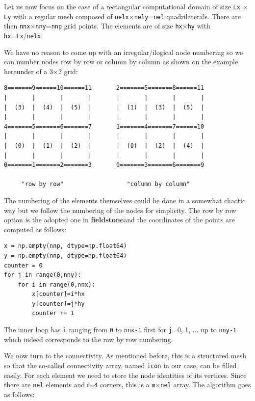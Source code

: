 \documentclass[a4paper]{article}
\newcommand{\fieldstone}{{\bf fieldstone}}
\begin{document}
Let us now focus on the case of a rectangular computational domain of size 
{\tt Lx} $\times$ {\tt Ly} with a regular mesh composed of {\tt nelx}$\times${\tt nely}={\tt nel}
   quadrilaterals.  
There are then {\tt nnx}$\times${\tt nny}={\tt nnp} grid points.
The elements are of size {\tt hx}$\times${\tt hy} with {\tt hx}={\tt Lx}/{\tt nelx}.

We have no reason to come up with an irregular/ilogical node numbering so 
we can number nodes row by row or column by column as shown on the example 
hereunder of a 3$\times$2 grid:

\begin{verbatim}
8=======9======10======11       2=======5=======8======11
|       |       |       |       |       |       |       |
|  (3)  |  (4)  |  (5)  |       |  (1)  |  (3)  |  (5)  |
|       |       |       |       |       |       |       |
4=======5=======6=======7       1=======4=======7======10
|       |       |       |       |       |       |       |
|  (0)  |  (1)  |  (2)  |       |  (0)  |  (2)  |  (4)  |
|       |       |       |       |       |       |       |
0=======1=======2=======3       0=======3=======6=======9

     "row by row"                  "column by column"
\end{verbatim}

The numbering of the elements themselves could be done in a somewhat chaotic 
way but we follow the numbering of the nodes for simplicity.
The row by row option is the adopted one in \fieldstone and the coordinates of the 
points are computed as follows:

\begin{lstlisting}
x = np.empty(nnp, dtype=np.float64)
y = np.empty(nnp, dtype=np.float64)
counter = 0
for j in range(0,nny):
    for i in range(0,nnx):
        x[counter]=i*hx
        y[counter]=j*hy
        counter += 1
\end{lstlisting}
The inner loop has {\tt i} ranging from {\tt 0} to {\tt nnx-1} first for {\tt j}=0, 1, ...
up to {\tt nny-1} which indeed corresponds to the row by row numbering.

We now turn to the connectivity. As mentioned before, this is a structured mesh so that the so-called
connectivity array, named {\tt icon} in our case, can be filled easily. For each element we need
to store the node identities of its vertices. Since there are {\tt nel} elements and {\tt m=4} corners, 
this is a {\tt m}$\times${\tt nel} array. The algorithm goes as follows:
\end{document}
